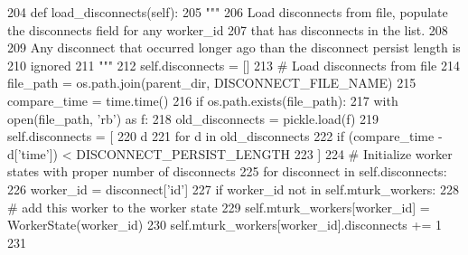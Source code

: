 \begin{DoxyCode}
204     \textcolor{keyword}{def }load\_disconnects(self):
205         \textcolor{stringliteral}{"""}
206 \textcolor{stringliteral}{        Load disconnects from file, populate the disconnects field for any worker\_id}
207 \textcolor{stringliteral}{        that has disconnects in the list.}
208 \textcolor{stringliteral}{}
209 \textcolor{stringliteral}{        Any disconnect that occurred longer ago than the disconnect persist length is}
210 \textcolor{stringliteral}{        ignored}
211 \textcolor{stringliteral}{        """}
212         self.disconnects = []
213         \textcolor{comment}{# Load disconnects from file}
214         file\_path = os.path.join(parent\_dir, DISCONNECT\_FILE\_NAME)
215         compare\_time = time.time()
216         \textcolor{keywordflow}{if} os.path.exists(file\_path):
217             with open(file\_path, \textcolor{stringliteral}{'rb'}) \textcolor{keyword}{as} f:
218                 old\_disconnects = pickle.load(f)
219                 self.disconnects = [
220                     d
221                     \textcolor{keywordflow}{for} d \textcolor{keywordflow}{in} old\_disconnects
222                     \textcolor{keywordflow}{if} (compare\_time - d[\textcolor{stringliteral}{'time'}]) < DISCONNECT\_PERSIST\_LENGTH
223                 ]
224         \textcolor{comment}{# Initialize worker states with proper number of disconnects}
225         \textcolor{keywordflow}{for} disconnect \textcolor{keywordflow}{in} self.disconnects:
226             worker\_id = disconnect[\textcolor{stringliteral}{'id'}]
227             \textcolor{keywordflow}{if} worker\_id \textcolor{keywordflow}{not} \textcolor{keywordflow}{in} self.mturk\_workers:
228                 \textcolor{comment}{# add this worker to the worker state}
229                 self.mturk\_workers[worker\_id] = WorkerState(worker\_id)
230             self.mturk\_workers[worker\_id].disconnects += 1
231 
\end{DoxyCode}
\mbox{\label{classparlai_1_1mturk_1_1core_1_1worker__manager_1_1WorkerManager_a252814b16fd59e725345146e6004e90a}} 
